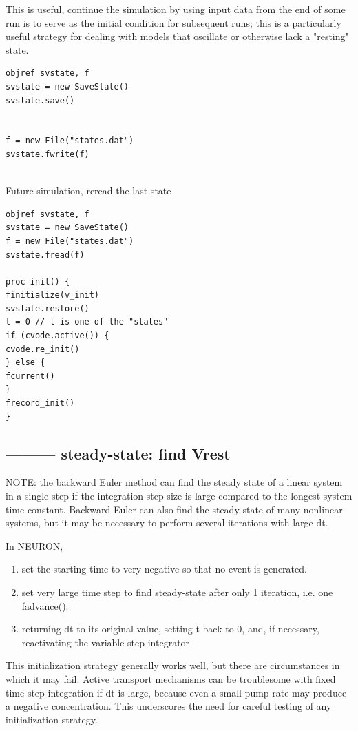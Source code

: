 This is useful, continue the simulation by using input data from the end of some
run is to serve as the initial condition for subsequent runs; this is a
particularly useful strategy for dealing with models that oscillate or otherwise
lack a "resting" state.

\begin{verbatim}
objref svstate, f
svstate = new SaveState()
svstate.save()


f = new File("states.dat")
svstate.fwrite(f)


\end{verbatim}

Future simulation, reread the last state
\begin{verbatim}
objref svstate, f
svstate = new SaveState()
f = new File("states.dat")
svstate.fread(f)

proc init() {
finitialize(v_init)
svstate.restore()
t = 0 // t is one of the "states"
if (cvode.active()) {
cvode.re_init()
} else {
fcurrent()
}
frecord_init()
}
\end{verbatim}

\subsection{--------- steady-state: find Vrest}
\label{sec:resting-membrane-potential-numerics-find}

NOTE: the backward Euler method can find the steady state of a linear system in
a single step if the integration step size is large compared to the longest
system time constant. Backward Euler can also find the steady state of many
nonlinear systems, but it may be necessary to perform several iterations with
large dt.


In NEURON, 
\begin{enumerate}
  \item set the starting time to very negative so that no event is generated.
  \item set very large time step to find steady-state after only 1 iteration,
  i.e. one fadvance().
  
  \item returning dt to its original value, setting t back to 0, and, if
  necessary, reactivating the variable step integrator 
\end{enumerate}
This initialization strategy generally works well, but there are circumstances in
which it may fail: Active transport mechanisms can be troublesome with fixed
time step integration if dt is large, because even a small pump rate may produce
a negative concentration. This underscores the need for careful testing of any
initialization strategy.

